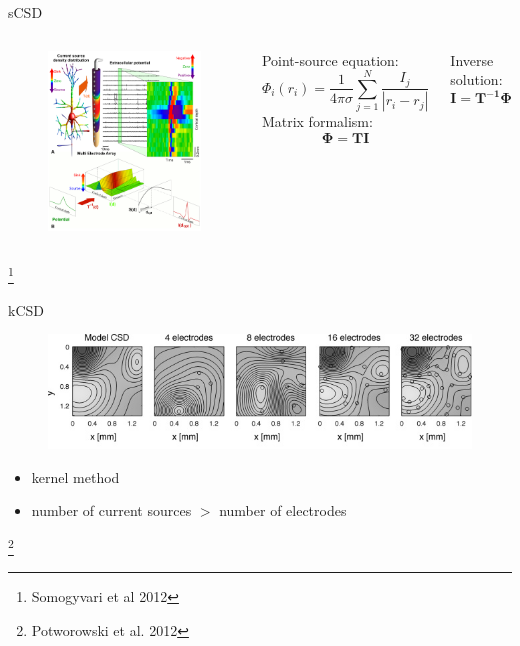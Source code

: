 \documentclass[11pt,a4paper,titlepage]{beamer}
\begin{document}
\begin{frame}{sCSD}
\begin{columns}
\begin{figure}
\includegraphics[height=6.5 cm]{plots/Fig1.pdf}

\end{figure}


Point-source equation:
\begin{equation}
\Phi_{i}(r_i)= \frac{1}{4\pi\sigma} \sum_{j=1}^N \frac{I_j}{|r_i-r_j|}
\end{equation}
Matrix formalism:
\begin{equation}
\mathbf{\Phi}= \mathbf{T} \mathbf{I}
\end{equation}

Inverse solution:
\begin{equation}
\mathbf{I}= \mathbf{T^{-1}} \mathbf{\Phi}
\end{equation}
\end{columns}
\footnote{Somogyvari et al 2012}
\end{frame}
\begin{frame}{kCSD}
\begin{figure}
\includegraphics[height=3 cm]{plots/kCSD.png}

\end{figure}
\begin{itemize}
\item kernel method
\item number of current sources $>$ number of electrodes
\end{itemize}


\footnote{Potworowski et al. 2012}
\end{frame}
\end{document}
